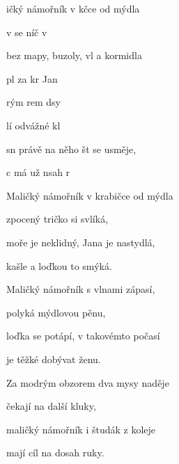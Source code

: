

\zs
{}ičký námořník v kčce od mýdla

v se níč v

bez mapy, buzoly, vl a kormidla

pl za kr Jan
\ks

\zr
{}rým rem dsy 

lí odvážné kl

sn právě na něho št se usměje,

c má už nsah r
\kr

\zs
Maličký námořník v krabičce od mýdla

zpocený tričko si svlíká,

moře je neklidný, Jana je nastydlá,

kašle a loďkou to smýká.
\ks

\zr \kr


\zs
Maličký námořník s vlnami zápasí,

polyká mýdlovou pěnu,

loďka se potápí, v takovémto počasí

je těžké dobývat ženu.
\ks

\zr

Za modrým obzorem dva mysy naděje

čekají na další kluky,

maličký námořník i študák z koleje

mají cíl na dosah ruky.
\kr

\kp






